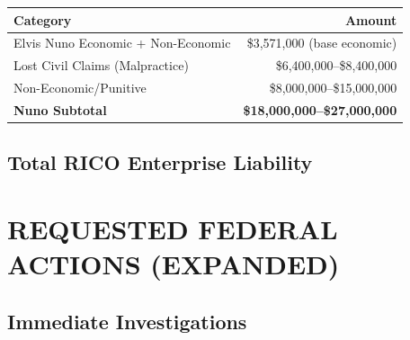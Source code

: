 \documentclass[11pt,letterpaper]{article}
\begin{document}
\begin{table}[H]
\centering
\begin{tabular}{lr}
\toprule
\textbf{Category} & \textbf{Amount}\\
\midrule
Elvis Nuno Economic + Non-Economic & \$3,571,000 (base economic)\\
Lost Civil Claims (Malpractice) & \$6,400,000--\$8,400,000\\
Non-Economic/Punitive & \$8,000,000--\$15,000,000\\
\midrule
\textbf{Nuno Subtotal} & \textbf{\$18,000,000--\$27,000,000}\\
\bottomrule
\end{tabular}
\end{table}

\subsection{Total RICO Enterprise Liability}

\begin{center}
\end{center}

\newpage

\section{REQUESTED FEDERAL ACTIONS (EXPANDED)}

\subsection{Immediate Investigations}
\end{document}
